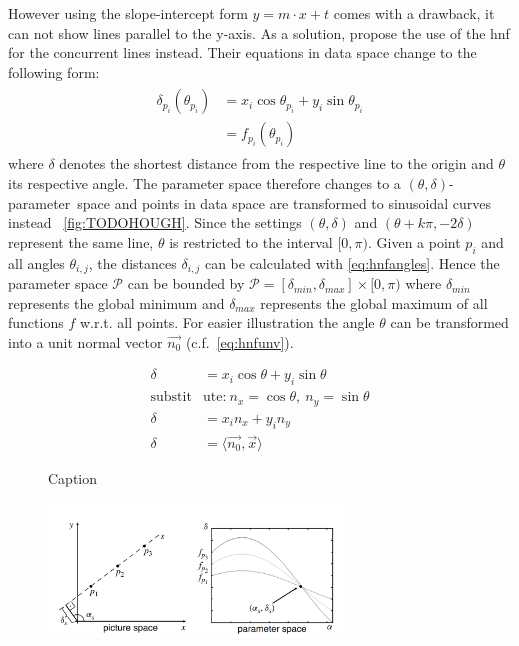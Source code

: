 However using the slope-intercept form $y = m \cdot x + t$ comes with a drawback, it can not show lines parallel to the y-axis. As a solution, \citeauthor{duda1971use} propose the use of the \gls{hnf} for the concurrent lines instead. Their equations in data space change to the following form:
\begin{align}\label{eq:hnfangles}
    \begin{split}
        \delta_{p_i}(\theta_{p_i}) &= x_i \cos{\theta_{p_i}} + y_i \sin{\theta_{p_i}}\\
        &= f_{p_i}(\theta_{p_i})
    \end{split}
\end{align}
where $\delta$ denotes the shortest distance from the respective line to the origin and $\theta$ its respective angle. The parameter space therefore changes to a \mbox{$(\theta,\delta)$-parameter space} and points in data space are transformed to sinusoidal curves instead ~\autoref{fig:TODOHOUGH}. Since the settings $(\theta,\delta)$ and $(\theta+k\pi,-2\delta)$ represent the same line, $\theta$ is restricted to the interval $[0,\pi)$. Given a point $p_i$ and all angles $\theta_{i,j}$, the distances $\delta_{i,j}$ can be calculated with \autoref{eq:hnfangles}. Hence the parameter space $\mathcal{P}$ can be bounded by $\mathcal{P} = [\delta_{min}, \delta_{max}]\times [0,\pi)$ where $\delta_{min}$ represents the global minimum and $\delta_{max}$ represents the global maximum of all functions $f$ w.r.t. all points. For easier illustration the angle $\theta$ can be transformed into a unit normal vector $\vec{n_0}$ (c.f.\ \autoref{eq:hnfunv}). 

\begin{align}
    \delta &= x_i \cos{\theta} + y_i \sin{\theta}\nonumber\\
    \text{substit}&\text{ute:}\ n_x = \cos{\theta},\ n_y = \sin{\theta} \nonumber\\
    \delta &= x_i n_x + y_i n_y\nonumber\\
    \label{eq:hnfunv}
    \delta &= \langle\vec{n_0},\vec{x}\rangle 
\end{align}

\begin{figure}
    \centering
    \caption{Caption}
    \label{fig:hnf_euclid}
\end{figure}

\begin{figure}
    \centering
    \includegraphics[width=0.7\textwidth]{figures/TODOHOUGHTHETADIST.png}
    \caption{\cite{CASHachtert2008global}}
    \label{fig:TODOHOUGH}
\end{figure}

